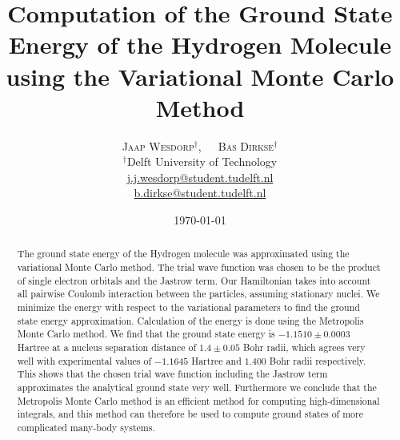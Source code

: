 \documentclass[twoside]{article}
\title{\vspace{-15mm}\fontsize{18pt}{10pt}\selectfont\textbf{Computation of the Ground State Energy of the Hydrogen Molecule using the Variational Monte Carlo Method}} %
\author{
	\large
	\textsc{Jaap Wesdorp}$^\dagger$, $\hspace{10pt}$ \textsc{Bas Dirkse}$^\dagger$ \\ %
	\normalsize $^\dagger$Delft University of Technology \\ %
	\normalsize \href{mailto:j.j.wesdorp@student.tudelft.nl}{j.j.wesdorp@student.tudelft.nl} \\
	\normalsize \href{mailto:b.dirkse@student.tudelft.nl}{b.dirkse@student.tudelft.nl} 
}
\date{\today\vspace{-8mm}}
\begin{document}


\maketitle %
\thispagestyle{firststyle} %


\begin{abstract}
\noindent  
The ground state energy of the Hydrogen molecule was approximated using the variational Monte Carlo method. The trial wave function was chosen to be the product of single electron orbitals and the Jastrow term. Our Hamiltonian takes into account all pairwise Coulomb interaction between the particles, assuming stationary nuclei. We minimize the energy with respect to the variational parameters to find the ground state energy approximation. Calculation of the energy is done using the Metropolis Monte Carlo method. We find that the ground state energy is $-1.1510 \pm 0.0003$ Hartree at a nucleus separation distance of $1.4 \pm 0.05$ Bohr radii, which agrees very well with experimental values of $-1.1645$ Hartree and $1.400$ Bohr radii respectively. This shows that the chosen trial wave function including the Jastrow term approximates the analytical ground state very well. Furthermore we conclude that the Metropolis Monte Carlo method is an efficient method for computing high-dimensional integrals, and this method can therefore be used to compute ground states of more complicated many-body systems.

	
\end{abstract}

\end{document}
